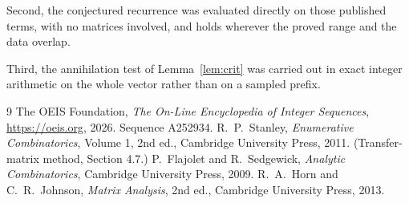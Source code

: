 \documentclass[11pt,a4paper]{article}
\theoremstyle{plain}
\theoremstyle{definition}
\begin{document}
Second, the conjectured recurrence was evaluated directly on those published terms, with no
matrices involved, and holds wherever the proved range and the data overlap.

Third, the annihilation test of Lemma~\ref{lem:crit} was carried out in exact integer
arithmetic on the whole vector rather than on a sampled prefix.

\begin{thebibliography}{9}
 The OEIS Foundation, \emph{The On-Line Encyclopedia of Integer
Sequences}, \url{https://oeis.org}, 2026. Sequence A252934.
 R.~P.~Stanley, \emph{Enumerative Combinatorics}, Volume 1, 2nd ed.,
Cambridge University Press, 2011. (Transfer-matrix method, Section 4.7.)
 P.~Flajolet and R.~Sedgewick, \emph{Analytic Combinatorics}, Cambridge
University Press, 2009.
 R.~A.~Horn and C.~R.~Johnson, \emph{Matrix Analysis}, 2nd ed., Cambridge
University Press, 2013.
\end{thebibliography}
\end{document}
